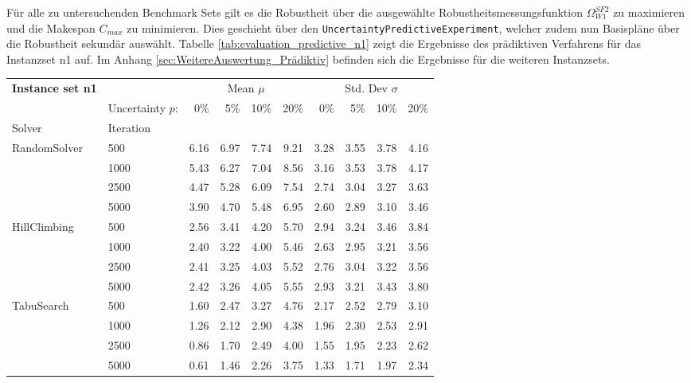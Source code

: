 Für alle zu untersuchenden Benchmark Sets gilt es die Robustheit über die ausgewählte Robustheitsmessungsfunktion $\Omega^{SF2}_{W1}$ zu maximieren und die Makespan $C_{max}$ zu minimieren. Dies geschieht über den \lstinline|UncertaintyPredictiveExperiment|, welcher zudem nun Basispläne über die Robustheit sekundär auswählt. Tabelle \ref{tab:evaluation_predictive_n1} zeigt die Ergebnisse des prädiktiven Verfahrens für das Instanzset n1 auf. Im Anhang \ref{sec:WeitereAuswertung_Prädiktiv} befinden sich die Ergebnisse für die weiteren Instanzsets. \\

{\footnotesize
\begin{longtable}{ll|rrrr|rrrr}
\toprule
\textbf{Instance set n1}                 & {} & \multicolumn{4}{c|}{Mean $\mu$} & \multicolumn{4}{c}{Std. Dev $\sigma$} \\
                & Uncertainty $p$: & 0\% & 5\% & 10\% & 20\% & 0\% & 5\% & 10\% & 20\% \\
Solver & Iteration &      &      &      &      &      &      &      &      \\
\midrule
RandomSolver & 500  & 6.16 & 6.97 & 7.74 & 9.21 & 3.28 & 3.55 & 3.78 & 4.16 \\
                 & 1000 & 5.43 & 6.27 & 7.04 & 8.56 & 3.16 & 3.53 & 3.78 & 4.17 \\
                 & 2500 & 4.47 & 5.28 & 6.09 & 7.54 & 2.74 & 3.04 & 3.27 & 3.63 \\
                 & 5000 & 3.90 & 4.70 & 5.48 & 6.95 & 2.60 & 2.89 & 3.10 & 3.46 \\ \hline
HillClimbing & 500  & 2.56 & 3.41 & 4.20 & 5.70 & 2.94 & 3.24 & 3.46 & 3.84 \\
                 & 1000 & 2.40 & 3.22 & 4.00 & 5.46 & 2.63 & 2.95 & 3.21 & 3.56 \\
                 & 2500 & 2.41 & 3.25 & 4.03 & 5.52 & 2.76 & 3.04 & 3.22 & 3.56 \\
                 & 5000 & 2.42 & 3.26 & 4.05 & 5.55 & 2.93 & 3.21 & 3.43 & 3.80 \\ \hline
TabuSearch & 500  & 1.60 & 2.47 & 3.27 & 4.76 & 2.17 & 2.52 & 2.79 & 3.10 \\
                 & 1000 & 1.26 & 2.12 & 2.90 & 4.38 & 1.96 & 2.30 & 2.53 & 2.91 \\
                 & 2500 & 0.86 & 1.70 & 2.49 & 4.00 & 1.55 & 1.95 & 2.23 & 2.62 \\
                 & 5000 & 0.61 & 1.46 & 2.26 & 3.75 & 1.33 & 1.71 & 1.97 & 2.34 \\ \hline

\end{longtable}}
